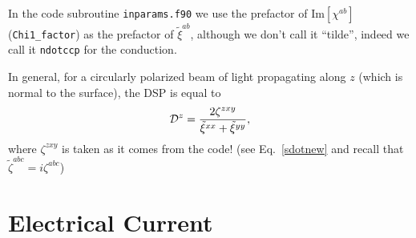 \documentclass[floatfix,prb,aps,superscriptaddress,11pt]{revtex4}
\begin{document}
In the code subroutine \verb=inparams.f90= we use the prefactor 
of Im$[\chi^{ab}]$ (\verb=Chi1_factor=) as the prefactor of
$\tilde\xi^{ab}$, although we don't call it ``tilde'', indeed we call
it \verb=ndotccp=  for the conduction.

In general, for a circularly polarized beam of light propagating along
$z$ (which is normal to the surface), the DSP is equal to
\begin{equation}\label{dsp3}
{\cal D}^z=\frac{2\zeta^{zxy}}{\tilde\xi^{xx}+\tilde\xi^{yy}}
,
\end{equation} 
where $\zeta^{zxy}$ is taken as it comes from the code!
(see Eq.~\eqref{sdotnew} and recall that $\tilde\zeta^{abc}=i\zeta^{abc}$)

\section{Electrical Current} 
\end{document}
